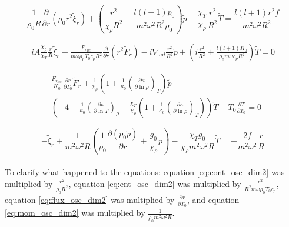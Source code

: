 \documentclass[11pt]{amsart}
\begin{document}
\begin{equation} \label{eq:cont_osc_dim2}
\frac{1}{\rho_{0} R}  \frac{\partial}{\partial r}\left( \rho_{0} r^{2} \tilde{\xi}_{r} \right)
+ \left( \frac{r^{2}}{\chi_{\rho} R^{2}} - \frac{l (l+1) p_{0}}{m^{2} \omega^{2} R^{2} \rho_{0} } \right) \tilde{p}
- \frac{\chi_{T}}{\chi_{\rho}} \frac{r^{2}}{R^{2}} \tilde{T}
=
\frac{l (l+1) r^{2} f}{m^{2} \omega^{2} R^{2}}
\end{equation}

\begin{multline} \label{eq:ent_osc_dim2}
i A \frac{\chi_{\rho}}{\chi_{T}} \frac{r}{R} \tilde{\xi}_{r}
+ \frac{F_{r_{BC}}}{m \omega \rho_{0} T_{0} c_{p} R^{2}} \frac{\partial}{\partial r} \left( r^{2} \tilde{F}_{r} \right)
-  i \nabla_{ad} \frac{r^{2}}{R^{2}} \tilde{p} 
+ \left( i \frac{r^{2}}{R^{2}} + \frac{l (l+1) K_{0}}{\rho_{0} m \omega c_{p} R^{2}} \right) \tilde{T}
=
0
\end{multline}

\begin{multline} \label{eq:flux_osc_dim2}
- \frac{F_{r_{BC}}}{K_{0}} \frac{\partial r}{\partial T_{0}} \tilde{F}_{r}
+ \frac{1}{\chi_{\rho}} \left( 1 + \frac{1}{\kappa_{0}} \left( \frac{\partial \kappa}{\partial \ln \rho} \right)_{T} \right) \tilde{p} \\
+ \left( - 4 + \frac{1}{\kappa_{0}} \left( \frac{\partial \kappa}{\partial \ln T} \right)_{\rho} - \frac{\chi_{T}}{\chi_{\rho}}  \left(  1 +  \frac{1}{\kappa_{0}}  \left( \frac{\partial \kappa}{\partial \ln \rho} \right)_{T} \right)    \right) \tilde{T}   -   T_{0} \frac{\partial \tilde{T}}{\partial T_{0}}
=
0
\end{multline}

\begin{equation} \label{eq:mom_osc_dim2}
- \tilde{\xi}_{r} 
+ \frac{1}{m^{2} \omega^{2} R} \left(  \frac{1}{\rho_{0}} \frac{\partial \left( p_{0} \tilde{p} \right)}{\partial r} +  \frac{g_{0}}{\chi_{\rho}} \tilde{p} \right)
- \frac{\chi_{T} g_{0}}{\chi_{\rho} m^{2} \omega^{2} R} \tilde{T}
=
- \frac{2 f}{m^{2} \omega^{2}} \frac{r}{R}
\end{equation}
\\

To clarify what happened to the equations: equation \ref{eq:cont_osc_dim2} was multiplied by $\frac{r^{2}}{\rho_{0} R^{2}}$, equation \ref{eq:ent_osc_dim2} was multiplied by $\frac{r^{2}}{R^{2} m \omega \rho_{0} T_{0} c_{p}}$, equation \ref{eq:flux_osc_dim2} was multiplied by $\frac{\partial r}{\partial T_{0}}$, and equation \ref{eq:mom_osc_dim2} was multiplied by $\frac{1}{\rho_{0} m^{2} \omega^{2} R}$.
\end{document}
